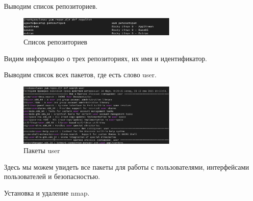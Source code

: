 \documentclass[
  12pt,
  a4paper,
  DIV=11,
  numbers=noendperiod]{scrreprt}
\begin{document}
Выводим список репозиториев.

\begin{figure}

{\centering \includegraphics[width=0.7\textwidth,height=\textheight]{image/2.png}

}

\caption{Список репозиториев}

\end{figure}%

Видим информацию о трех репозиториях, их имя и идентификатор.

Выводим список всех пакетов, где есть слово user.

\begin{figure}

{\centering \includegraphics[width=0.7\textwidth,height=\textheight]{image/3.png}

}

\caption{Пакеты user}

\end{figure}%

Здесь мы можем увидеть все пакеты для работы с пользователями,
интерфейсами пользователей и безопасностью.

Установка и удаление nmap.
\end{document}
